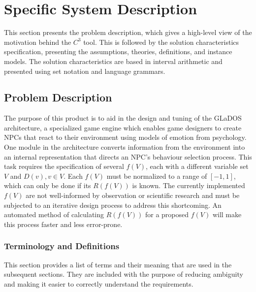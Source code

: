 \documentclass[12pt]{article}
\newcommand{\prognameAbbrv}{$C^{3}$}
\begin{document}
\newpage

\section{Specific System Description}
\label{specific}
This section presents the problem description, which gives a high-level
view of the motivation behind the \prognameAbbrv{} tool. This is followed by 
the solution characteristics specification, presenting the assumptions, 
theories, definitions, and instance models. The solution characteristics are 
based in interval arithmetic and presented using set notation and language 
grammars. 

\subsection{Problem Description} 
\label{Sec_pd}
The purpose of this product is to aid in the design and tuning of the GLaDOS 
architecture, a specialized game engine which enables game designers to create 
NPCs that react to their environment using models of emotion from 
psychology. One module in the architecture converts information from the 
environment into an internal representation that directs an NPC's behaviour 
selection process. This task requires the specification of several $f(V)$, each 
with a different variable set $V$ and $D(v), v \in V$. Each $f(V)$ must be 
normalized to a range of $[-1,1]$, which can only be done if its $R(f(V))$ is 
known. The currently implemented $f(V)$ are not well-informed by observation or 
scientific research and must be subjected to an iterative design process to 
address this shortcoming. An automated method of calculating $R(f(V))$ for a 
proposed $f(V)$ will make this process faster and less error-prone.

\subsubsection{Terminology and  Definitions}
This section provides a list of terms and their meaning that are used in the 
subsequent sections. They are included with the purpose of reducing ambiguity 
and making it easier to correctly understand the requirements.
\end{document}
